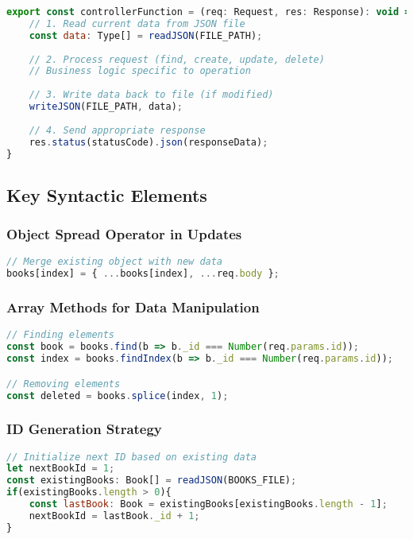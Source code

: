 \documentclass[11pt,a4paper]{article}
\begin{document}
\begin{lstlisting}[language=JavaScript, caption=Generic Controller Pattern]
export const controllerFunction = (req: Request, res: Response): void => {
    // 1. Read current data from JSON file
    const data: Type[] = readJSON(FILE_PATH);
    
    // 2. Process request (find, create, update, delete)
    // Business logic specific to operation
    
    // 3. Write data back to file (if modified)
    writeJSON(FILE_PATH, data);
    
    // 4. Send appropriate response
    res.status(statusCode).json(responseData);
}
\end{lstlisting}

\subsection{Key Syntactic Elements}

\subsubsection{Object Spread Operator in Updates}
\begin{lstlisting}[language=JavaScript]
// Merge existing object with new data
books[index] = { ...books[index], ...req.body };
\end{lstlisting}

\subsubsection{Array Methods for Data Manipulation}
\begin{lstlisting}[language=JavaScript]
// Finding elements
const book = books.find(b => b._id === Number(req.params.id));
const index = books.findIndex(b => b._id === Number(req.params.id));

// Removing elements
const deleted = books.splice(index, 1);
\end{lstlisting}

\subsubsection{ID Generation Strategy}
\begin{lstlisting}[language=JavaScript]
// Initialize next ID based on existing data
let nextBookId = 1;
const existingBooks: Book[] = readJSON(BOOKS_FILE);
if(existingBooks.length > 0){
    const lastBook: Book = existingBooks[existingBooks.length - 1];
    nextBookId = lastBook._id + 1;
}
\end{lstlisting}
\end{document}
